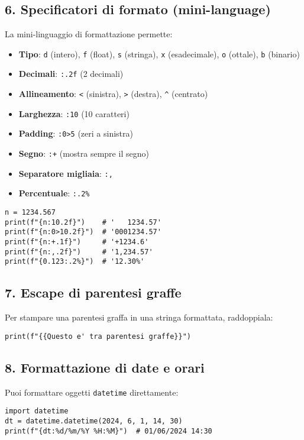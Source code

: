 \documentclass[a4paper,12pt]{article}
\begin{document}
\subsection*{6. Specificatori di formato (mini-language)}
La mini-linguaggio di formattazione permette:
\begin{itemize}
    \item \textbf{Tipo}: \texttt{d} (intero), \texttt{f} (float), \texttt{s} (stringa), \texttt{x} (esadecimale), \texttt{o} (ottale), \texttt{b} (binario)
    \item \textbf{Decimali}: \texttt{:.2f} (2 decimali)
    \item \textbf{Allineamento}: \texttt{\textless} (sinistra), \texttt{\textgreater} (destra), \texttt{\textasciicircum} (centrato)
    \item \textbf{Larghezza}: \texttt{:10} (10 caratteri)
    \item \textbf{Padding}: \texttt{:0\textgreater5} (zeri a sinistra)
    \item \textbf{Segno}: \texttt{:+} (mostra sempre il segno)
    \item \textbf{Separatore migliaia}: \texttt{:,}
    \item \textbf{Percentuale}: \texttt{:.2\%}
\end{itemize}
\begin{lstlisting}
n = 1234.567
print(f"{n:10.2f}")    # '   1234.57'
print(f"{n:0>10.2f}")  # '0001234.57'
print(f"{n:+.1f}")     # '+1234.6'
print(f"{n:,.2f}")     # '1,234.57'
print(f"{0.123:.2%}")  # '12.30%'
\end{lstlisting}

\subsection*{7. Escape di parentesi graffe}
Per stampare una parentesi graffa in una stringa formattata, raddoppiala:
\begin{lstlisting}
print(f"{{Questo e' tra parentesi graffe}}")
\end{lstlisting}

\subsection*{8. Formattazione di date e orari}
Puoi formattare oggetti \texttt{datetime} direttamente:
\begin{lstlisting}
import datetime
dt = datetime.datetime(2024, 6, 1, 14, 30)
print(f"{dt:%d/%m/%Y %H:%M}")  # 01/06/2024 14:30
\end{lstlisting}
\end{document}
